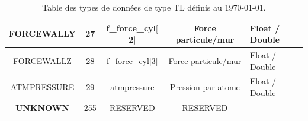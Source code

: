 \documentclass[a4paper,12pt]{article}
\begin{document}
{{{\begin{table}
\begin{minipage}{\linewidth}
\begin{tabular}{|c|c|c|c|l|}
   FORCEWALLY   &27  & f\_force\_cyl$[$2$]$ & Force particule/mur           & Float / Double \footnotemark[2]\\ \hline
   FORCEWALLZ   &28  & f\_force\_cyl$[$3$]$ & Force particule/mur           & Float / Double \footnotemark[2]\\ \hline
   ATMPRESSURE   &29  & atmpressure & Pression par atome   & Float / Double \footnotemark[2]\\ \hline
    \textbf{UNKNOWN} &255 & RESERVED         & RESERVED &\\ \hline
 \end{tabular}
 \end{minipage}
\caption{Table des types de donn\'ees de type TL d\'efinis au \today.}\label{Types}
\end{table}

}}}
\end{document}

